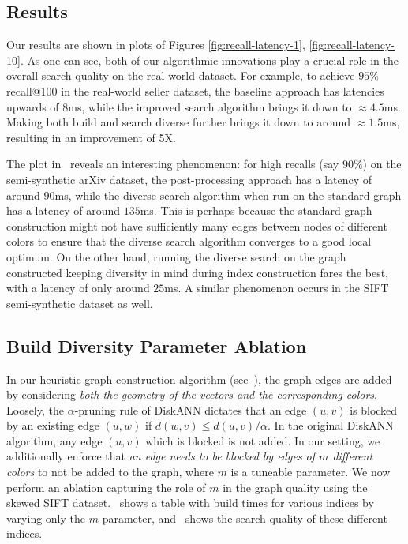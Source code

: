 \subsection{Results}\label{sec:results-exp}
Our results are shown in plots of Figures \ref{fig:recall-latency-1}, \ref{fig:recall-latency-10}. As one can see, both of our algorithmic innovations play a crucial role in the overall search quality on the real-world dataset. For example, to achieve $95\%$ recall@100 in the real-world seller dataset, the baseline approach has latencies upwards of $8$ms, while the improved search algorithm brings it down to $\approx 4.5$ms. Making both build and search diverse further brings it down to around $\approx 1.5$ms, resulting in an improvement of 5X. 

The plot in~ reveals an interesting phenomenon: for high recalls (say $90\%$) on the semi-synthetic arXiv dataset, the post-processing approach has a latency of around $90$ms, while the diverse search algorithm when run on the standard graph has a latency of around $135$ms. This is perhaps because the standard graph construction might not have sufficiently many edges between nodes of different colors to ensure that the diverse search algorithm converges to a good local optimum. On the other hand, running the diverse search on the graph constructed keeping diversity in mind during index construction fares the best, with a latency of only around $25$ms. A similar phenomenon occurs in the SIFT semi-synthetic dataset as well.


\subsection{Build Diversity Parameter Ablation}\label{sec:ablation}
In our heuristic graph construction algorithm (see~), the graph edges are added by considering \emph{both the geometry of the vectors and the corresponding colors}. Loosely, the $\alpha$-pruning rule of DiskANN dictates that an edge $(u,v)$ is blocked by an existing edge $(u,w)$ if $d(w,v) \leq d(u,v)/\alpha$. In the original DiskANN algorithm, any edge $(u,v)$ which is blocked is not added. In our setting, we additionally enforce that \emph{an edge needs to be blocked by edges of $m$ different colors} to not be added to the graph, where $m$ is a tuneable parameter. We now perform an ablation capturing the role of $m$ in the graph quality using the skewed SIFT dataset.~ shows a table with build times for various indices by varying only the $m$ parameter, and~ shows the search quality of these different indices.


